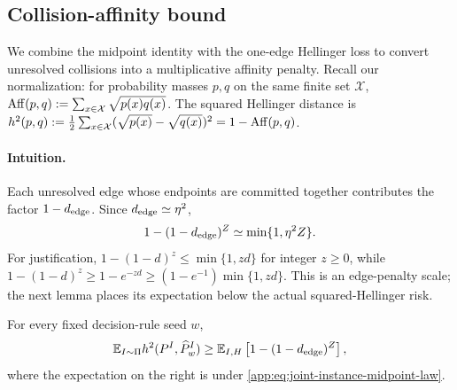 \subsection{Collision-affinity bound}
\label{app:lower-proof-affinity}

We combine the midpoint identity with the one-edge Hellinger loss to
convert unresolved collisions into a multiplicative affinity penalty.
Recall our normalization: for probability masses \(p,q\) on the same
finite set \(\mathcal X\),
\(\HellingerAffinity(p,q):=\sum_{x\in\mathcal X}\sqrt{p(x)q(x)}\).
The squared Hellinger distance is
\(\sqHellinger(p,q):=\tfrac12\sum_{x\in\mathcal X}
(\sqrt{p(x)}-\sqrt{q(x)})^2=1-\HellingerAffinity(p,q)\).

\paragraph{Intuition.}
Each unresolved edge whose endpoints are committed together contributes
the factor $1-\HardEdgeDistance$.  Since
$\HardEdgeDistance\simeq\EdgeCoupling^2$,
\[
 1-(1-\HardEdgeDistance)^{\TotalCollisions}
 \simeq
 \min\{1,\EdgeCoupling^2\TotalCollisions\}.
\]
For justification, $1-(1-d)^z\le\min\{1,zd\}$ for integer $z\ge0$, while
$1-(1-d)^z\ge1-e^{-zd}\ge(1-e^{-1})\min\{1,zd\}$.
This is an edge-penalty scale; the next lemma places its expectation below
the actual squared-Hellinger risk.

\begin{lemma}
\label{app:lem:collision-affinity}
For every fixed decision-rule seed \(w\),
\begin{equation}
 \mathbb E_{I\sim\HardInstancePrior}
 \sqHellinger(\HardTargetLaw{I},\HardOutputLaw{I}{w})
 \ge
 \mathbb E_{I,H}
 \left[1-(1-\HardEdgeDistance)^{\TotalCollisions}\right],
 \label{app:eq:global-collision-affinity}
\end{equation}
where the expectation on the right is under
\eqref{app:eq:joint-instance-midpoint-law}.
\end{lemma}

